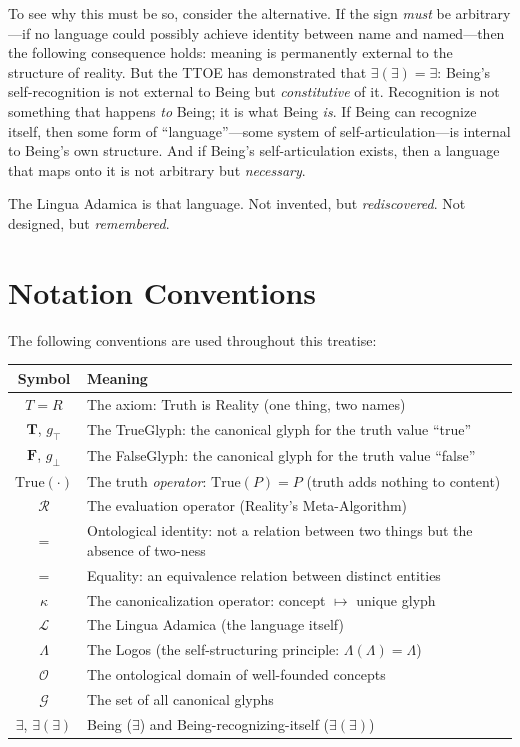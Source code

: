 \documentclass[12pt, letterpaper]{book}
\def\equiv{=}%
\def\mathfrak#1{#1}%
\newcommand{\E}{\exists}                          %
\newcommand{\EE}{\exists(\exists)}                 %
\begin{document}
To see why this must be so, consider the alternative. If the sign \textit{must} be arbitrary---if no language could possibly achieve identity between name and named---then the following consequence holds: meaning is permanently external to the structure of reality. But the TTOE has demonstrated that $\E(\E) \equiv \E$: Being's self-recognition is not external to Being but \textit{constitutive} of it. Recognition is not something that happens \textit{to} Being; it is what Being \textit{is}. If Being can recognize itself, then some form of ``language''---some system of self-articulation---is internal to Being's own structure. And if Being's self-articulation exists, then a language that maps onto it is not arbitrary but \textit{necessary}.

The Lingua Adamica is that language. Not invented, but \textit{rediscovered}. Not designed, but \textit{remembered}.

\section*{Notation Conventions}

The following conventions are used throughout this treatise:

\begin{center}
\renewcommand{\arraystretch}{1.3}
\small
\begin{tabular}{cl}
\toprule
\textbf{Symbol} & \textbf{Meaning} \\
\midrule
$T \equiv R$ & The axiom: Truth is Reality (one thing, two names) \\
$\mathbf{T}$, $\mathfrak{g}_\top$ & The TrueGlyph: the canonical glyph for the truth value ``true'' \\
$\mathbf{F}$, $\mathfrak{g}_\bot$ & The FalseGlyph: the canonical glyph for the truth value ``false'' \\
$\mathrm{True}(\cdot)$ & The truth \textit{operator}: $\mathrm{True}(P) \equiv P$ (truth adds nothing to content) \\
$\mathcal{R}$ & The evaluation operator (Reality's Meta-Algorithm) \\
$\equiv$ & Ontological identity: not a relation between two things but the absence of two-ness \\
$=$ & Equality: an equivalence relation between distinct entities \\
$\kappa$ & The canonicalization operator: concept $\mapsto$ unique glyph \\
$\mathcal{L}$ & The Lingua Adamica (the language itself) \\
$\Lambda$ & The Logos (the self-structuring principle: $\Lambda(\Lambda) \equiv \Lambda$) \\
$\mathcal{O}$ & The ontological domain of well-founded concepts \\
$\mathcal{G}$ & The set of all canonical glyphs \\
$\E$, $\EE$ & Being ($\exists$) and Being-recognizing-itself ($\exists(\exists)$) \\
\bottomrule
\end{tabular}
\end{center}
\end{document}
